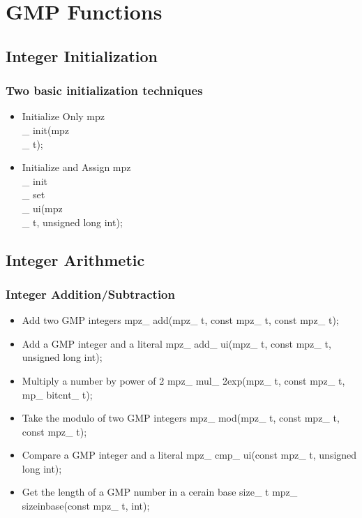 \section{GMP Functions}


\subsection{Integer Initialization}

\begin{frame}
\frametitle{Two basic initialization techniques}
\begin{itemize}
  \item Initialize Only
  mpz\\_ init(mpz\\_ t);
  \item Initialize and Assign
  mpz\\_ init\\_ set\\_ ui(mpz\\_ t, unsigned long int);
\end{itemize}
\end{frame}


\subsection{Integer Arithmetic}

\begin{frame}
\frametitle{Integer Addition/Subtraction}
\begin{itemize}
  \item Add two GMP integers
  mpz\_ add(mpz\_ t, const mpz\_ t, const mpz\_ t);
  \item Add a GMP integer and a literal
  mpz\_ add\_ ui(mpz\_ t, const mpz\_ t, unsigned long int);
  \item Multiply a number by power of 2
  mpz\_ mul\_ 2exp(mpz\_ t, const mpz\_ t, mp\_ bitcnt\_ t);
  \item Take the modulo of two GMP integers
  mpz\_ mod(mpz\_ t, const mpz\_ t, const mpz\_ t);
  \item Compare a GMP integer and a literal
  mpz\_ cmp\_ ui(const mpz\_ t, unsigned long int);
  \item Get the length of a GMP number in a cerain base
  size\_ t mpz\_ sizeinbase(const mpz\_ t, int);
\end{itemize}
\end{frame}

